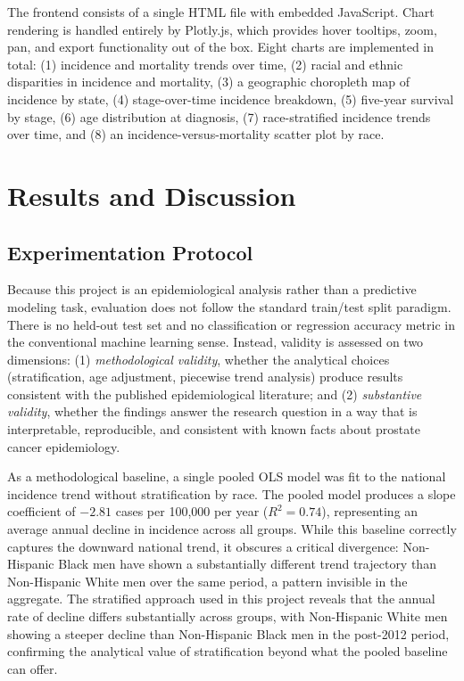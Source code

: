 \documentclass[12pt]{article}
\begin{document}
The frontend consists of a single HTML file with embedded JavaScript. Chart rendering
is handled entirely by Plotly.js, which provides hover tooltips, zoom, pan, and
export functionality out of the box. Eight charts are implemented in total: (1)
incidence and mortality trends over time, (2) racial and ethnic disparities in
incidence and mortality, (3) a geographic choropleth map of incidence by state,
(4) stage-over-time incidence breakdown, (5) five-year survival by stage, (6)
age distribution at diagnosis, (7) race-stratified incidence trends over time, and
(8) an incidence-versus-mortality scatter plot by race.

\section{Results and Discussion}

\subsection{Experimentation Protocol}

Because this project is an epidemiological analysis rather than a predictive
modeling task, evaluation does not follow the standard train/test split paradigm.
There is no held-out test set and no classification or regression accuracy metric
in the conventional machine learning sense. Instead, validity is assessed on two
dimensions: (1) \textit{methodological validity}, whether the analytical choices
(stratification, age adjustment, piecewise trend analysis) produce results consistent
with the published epidemiological literature; and (2) \textit{substantive validity},
whether the findings answer the research question in a way that is interpretable,
reproducible, and consistent with known facts about prostate cancer epidemiology.

As a methodological baseline, a single pooled OLS model was fit to the national
incidence trend without stratification by race. The pooled model produces a slope
coefficient of $-2.81$ cases per 100,000 per year ($R^2 = 0.74$), representing
an average annual decline in incidence across all groups. While this baseline
correctly captures the downward national trend, it obscures a critical divergence:
Non-Hispanic Black men have shown a substantially different trend trajectory than
Non-Hispanic White men over the same period, a pattern invisible in the aggregate.
The stratified approach used in this project reveals that the annual rate of decline
differs substantially across groups, with Non-Hispanic White men showing a steeper
decline than Non-Hispanic Black men in the post-2012 period, confirming the
analytical value of stratification beyond what the pooled baseline can offer.
\end{document}
